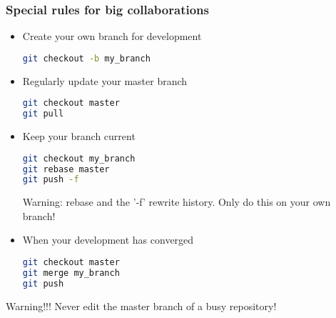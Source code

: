 \begin{frame}[fragile]
  \frametitle{Special rules for big collaborations}
  \begin{itemize}
  \item Create your own branch for development
    \begin{block}{}
    \begin{lstlisting}[language=bash]
git checkout -b my_branch
    \end{lstlisting}      
    \end{block}
    \item Regularly update your master branch
    \begin{block}{}
    \begin{lstlisting}[language=bash]
git checkout master
git pull
    \end{lstlisting}      
    \end{block}
    \item Keep your branch current
    \begin{block}{}
    \begin{lstlisting}[language=bash]
git checkout my_branch
git rebase master
git push -f
    \end{lstlisting}      
    \end{block}
    Warning: rebase and the '-f' rewrite history. Only do this on
    your own branch!
    \item When your development has converged
    \begin{block}{}
    \begin{lstlisting}[language=bash]
git checkout master
git merge my_branch
git push
    \end{lstlisting}      
    \end{block}
  \end{itemize}
\end{frame}

\begin{frame}
  \begin{alertblock}{Warning!!!}
    Never edit the master branch of a busy repository!
  \end{alertblock}
\end{frame}

